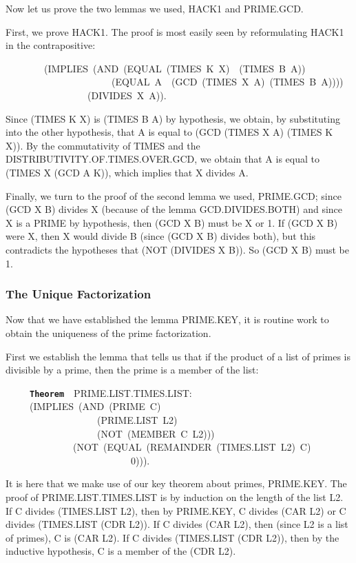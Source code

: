 \documentclass[11pt]{book}
\newenvironment{pubasis}{\begin{flushleft}\ttfamily\small}{\normalsize\rmfamily\end{flushleft}}
\newcommand{\axiomordefinition}[1]{\vspace{6pt}\texttt{\textbf{#1}}}
\newcommand{\pubdefaulttextsize}{\large}
\begin{document}
Now let us prove the two lemmas we used, HACK1 and PRIME.GCD.

First, we  prove HACK1.  The proof is most easily seen by reformulating
HACK1 in the contrapositive:
\begin{pubasis}
~~~~~~~~(IMPLIES~(AND~(EQUAL~(TIMES~K~X)~~(TIMES~B~A))\\
~~~~~~~~~~~~~~~~~~~~~~(EQUAL~A~~(GCD~(TIMES~X~A)~(TIMES~B~A))))\\
~~~~~~~~~~~~~~~~~(DIVIDES~X~A)).\\
\end{pubasis}
Since (TIMES K X) is (TIMES B A) by hypothesis, we obtain, by substituting into
the other hypothesis, that A is equal to (GCD (TIMES X A) (TIMES K X)).
By the commutativity of TIMES and the DIS\-TRI\-BU\-TIV\-ITY.OF.TIMES.OVER.GCD,
we obtain that A is equal to (TIMES X (GCD A K)), which implies that
X divides A.

Finally, we turn to the proof of the second lemma we used, PRIME.GCD; since (GCD X B) divides X (because
of the lemma GCD.DIVIDES.BOTH) and since X is a PRIME by
hypothesis, then (GCD X B) must be X or 1.  If (GCD X B)
were X, then X would divide B (since (GCD X B) divides both),
but this contradicts the hypotheses that (NOT (DIVIDES X B)).
So (GCD X B) must be 1.
\subsubsection{The Unique Factorization}
\pubdefaulttextsize
Now that we have established the lemma PRIME.KEY, it is routine
work to obtain the uniqueness of the prime factorization.

First we establish the lemma that tells us that if the product
of a list of primes is divisible by a prime, then the prime is
a member of the list:
\begin{pubasis}
~~~~~\axiomordefinition{Theorem}~~PRIME.LIST.TIMES.LIST:\\
~~~~~(IMPLIES~(AND~(PRIME~C)\\
~~~~~~~~~~~~~~~~~~~(PRIME.LIST~L2)\\
~~~~~~~~~~~~~~~~~~~(NOT~(MEMBER~C~L2)))\\
~~~~~~~~~~~~~~(NOT~(EQUAL~(REMAINDER~(TIMES.LIST~L2)~C)\\
~~~~~~~~~~~~~~~~~~~~~~~~~~0))).\\
\end{pubasis}
It is here that  we make use of our key theorem about primes,
PRIME.KEY.
The proof of PRIME.LIST.TIMES.LIST is by induction on the length
of the list L2.  If C divides (TIMES.LIST L2), then by PRIME.KEY, C
divides (CAR L2) or C divides (TIMES.LIST (CDR L2)).  If C divides
(CAR L2), then (since L2 is a list of primes), C
is (CAR L2).  If C divides (TIMES.LIST (CDR  L2)), then by
the inductive hypothesis, C is a member of the (CDR L2).  
\end{document}
